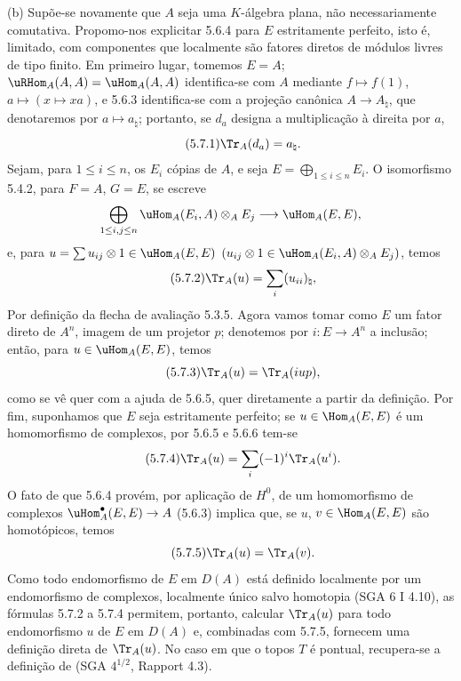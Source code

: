 (b) Supõe-se novamente que $A$ seja uma $K$-álgebra plana, não necessariamente comutativa. Propomo-nos explicitar 5.6.4 para $E$ estritamente perfeito, isto é, limitado, com componentes que localmente são fatores diretos de módulos livres de tipo finito. Em primeiro lugar, tomemos $E=A$; $\uRHom_A(A,A)=\uHom_A(A,A)$ identifica-se com $A$ mediante $f\mapsto f(1)$, $a\mapsto(x\mapsto xa)$, e 5.6.3 identifica-se com a projeção canônica $A\to A_\natural$, que denotaremos por $a\mapsto a_\natural$; portanto, se $d_a$ designa a multiplicação à direita por $a$,
\begin{equation}\tag{5.7.1}
\Tr_A(d_a)=a_\natural.
\end{equation}
Sejam, para $1\le i\le n$, os $E_i$ cópias de $A$, e seja $E=\bigoplus_{1\le i\le n}E_i$. O isomorfismo 5.4.2, para $F=A$, $G=E$, se escreve
\[
\bigoplus_{1\le i,j\le n}\uHom_A(E_i,A)\otimes_AE_j\longrightarrow\uHom_A(E,E),
\]
e, para $u=\sum u_{ij}\otimes 1\in\uHom_A(E,E)$ $(u_{ij}\otimes 1\in\uHom_A(E_i,A)\otimes_A E_j)$, temos
\begin{equation}\tag{5.7.2}
\Tr_A(u)=\sum_i (u_{ii})_\natural,
\end{equation}
Por definição da flecha de avaliação 5.3.5. Agora vamos tomar como $E$ um fator direto de $A^n$, imagem de um projetor $p$; denotemos por $i:E\to A^n$ a inclusão; então, para $u\in\uHom_A(E,E)$, temos
\begin{equation}\tag{5.7.3}
\Tr_A(u)=\Tr_A(iup),
\end{equation}
como se vê quer com a ajuda de 5.6.5, quer diretamente a partir da definição. Por fim, suponhamos que $E$ seja estritamente perfeito; se $u\in\Hom_A(E,E)$ é um homomorfismo de complexos, por 5.6.5 e 5.6.6 tem-se
\begin{equation}\tag{5.7.4}
\Tr_A(u)=\sum_i(-1)^i\Tr_A(u^i).
\end{equation}
O fato de que 5.6.4 provém, por aplicação de $H^0$, de um homomorfismo de complexos $\uHom_A^\bullet(E,E)\to A$ (5.6.3) implica que, se $u$, $v\in\Hom_A(E,E)$ são homotópicos, temos
\begin{equation}\tag{5.7.5}
\Tr_A(u)=\Tr_A(v).
\end{equation}
Como todo endomorfismo de $E$ em $D(A)$ está definido localmente por um endomorfismo de complexos, localmente único salvo homotopia (SGA 6 I 4.10), as fórmulas 5.7.2 a 5.7.4 permitem, portanto, calcular $\Tr_A(u)$ para todo endomorfismo $u$ de $E$ em $D(A)$ e, combinadas com 5.7.5, fornecem uma definição direta de $\Tr_A(u)$. No caso em que o topos $T$ é pontual, recupera-se a definição de (SGA $4^{1/2}$, Rapport 4.3).

